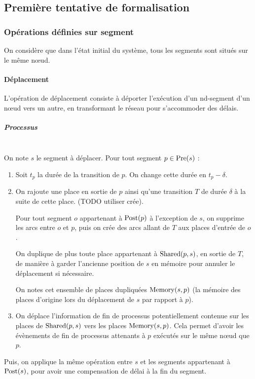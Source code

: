 \subsection{Première tentative de formalisation}
\subsubsection{Opérations définies sur segment}
On considère que dans l'état initial du système, tous les segments sont situés sur le même nœud.

\paragraph{Déplacement}
L'opération de déplacement consiste à déporter l'exécution d'un nd-segment d'un nœud vers un autre, en transformant le réseau pour s'accommoder des délais.

\subparagraph{Processus} ~ \\

On note $s$ le segment à déplacer.
Pour tout segment $p \in \operatorname{Pre}(s)$ : 

\begin{enumerate}
\item Soit $t_p$ la durée de la transition de $p$. On change cette durée en $t_p - \delta$.
\item On rajoute une place en sortie de $p$ ainsi qu'une transition $T$ de durée $\delta$ à la suite de cette place. (TODO utiliser crée).

Pour tout segment $o$ appartenant à $\operatorname{Post}(p)$ à l'exception de $s$, on supprime les arcs entre $o$ et $p$, puis on crée des arcs allant de $T$ aux places d'entrée de $o$.

On duplique de plus toute place appartenant à $\operatorname{Shared}(p, s)$, en sortie de $T$, de manière à garder l'ancienne position de $s$ en mémoire pour annuler le déplacement si nécessaire.

On notes cet ensemble de places dupliquées $\operatorname{Memory}(s, p)$ (la mémoire des places d'origine lors du déplacement de $s$ par rapport à $p$).
 
\item On déplace l'information de fin de processus potentiellement contenue sur les places de $\operatorname{Shared}(p, s)$ vers les places  $\operatorname{Memory}(s, p)$. Cela permet d'avoir les évènements de fin de processus attenants à $p$ exécutés sur le même nœud que $p$.
\end{enumerate}

Puis, on applique la même opération entre $s$ et les segments appartenant à $\operatorname{Post}(s)$, pour avoir une compensation de délai à la fin du segment.

